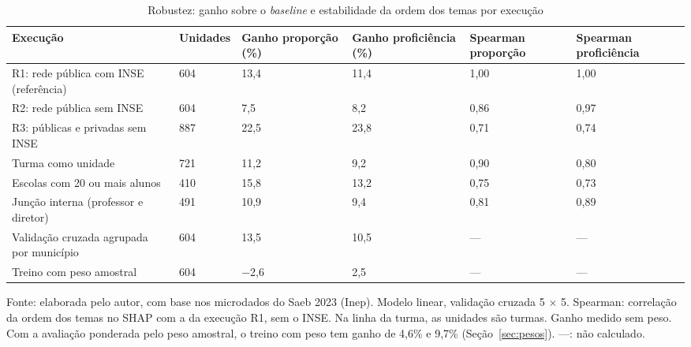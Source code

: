\begin{table}[H]
    \centering
    \footnotesize
    \caption{Robustez: ganho sobre o \textit{baseline} e estabilidade da ordem dos temas por execução}
    \begin{tabular}{L{5.0cm}C{1.4cm}C{1.5cm}C{1.5cm}C{1.5cm}C{1.5cm}}
        \toprule
        \textbf{Execução} & \textbf{Unidades} & \textbf{Ganho proporção (\%)} & \textbf{Ganho proficiência (\%)} & \textbf{Spearman proporção} & \textbf{Spearman proficiência} \\
        \midrule
        R1: rede pública com INSE (referência) & 604 & 13,4 & 11,4 & 1,00 & 1,00 \\
        R2: rede pública sem INSE & 604 & 7,5 & 8,2 & 0,86 & 0,97 \\
        R3: públicas e privadas sem INSE & 887 & 22,5 & 23,8 & 0,71 & 0,74 \\
        Turma como unidade & 721 & 11,2 & 9,2 & 0,90 & 0,80 \\
        Escolas com 20 ou mais alunos & 410 & 15,8 & 13,2 & 0,75 & 0,73 \\
        Junção interna (professor e diretor) & 491 & 10,9 & 9,4 & 0,81 & 0,89 \\
        Validação cruzada agrupada por município & 604 & 13,5 & 10,5 & --- & --- \\
        Treino com peso amostral & 604 & $-$2,6 & 2,5 & --- & --- \\
        \bottomrule
    \end{tabular}
    \vspace{0.1cm}
    \begin{flushleft}
    {\footnotesize Fonte: elaborada pelo autor, com base nos microdados do Saeb 2023 (Inep). Modelo linear, validação cruzada 5 $\times$ 5. Spearman: correlação da ordem dos temas no SHAP com a da execução R1, sem o INSE. Na linha da turma, as unidades são turmas. Ganho medido sem peso. Com a avaliação ponderada pelo peso amostral, o treino com peso tem ganho de 4,6\% e 9,7\% (Seção~\ref{sec:pesos}). ---: não calculado.}
    \end{flushleft}
    \label{tab:robustez}
\end{table}
